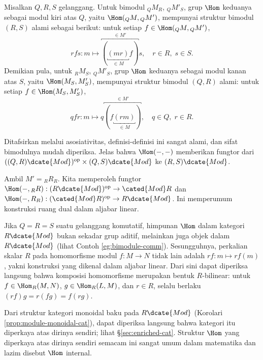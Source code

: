 \begin{definition}\label{def:Hom-bimodule}
	Misalkan $Q, R, S$ gelanggang. Untuk bimodul ${}_Q M_R$, ${}_Q M'_S$, grup $\Hom$ keduanya sebagai modul kiri atas $Q$, yaitu $\Hom({}_Q M, {}_Q M')$, mempunyai struktur bimodul $(R, S)$ alami sebagai berikut: untuk setiap $f \in \Hom({}_Q M, {}_Q M')$,
	\[ rfs: m \longmapsto \overbracket{( \underbracket{(mr)}_{\in M} f )}^{\in M'} s, \quad r \in R, \; s \in S. \]
	Demikian pula, untuk ${}_R M_S$, ${}_Q M'_S$, grup $\Hom$ keduanya sebagai modul kanan atas $S$, yaitu $\Hom(M_S, M'_S)$, mempunyai struktur bimodul $(Q, R)$ alami: untuk setiap $f \in \Hom(M_S, M'_S)$,
	\[ qfr: m \longmapsto q \overbracket{( f\underbracket{(rm)}_{\in M} )}^{\in M'}, \quad q \in Q, \; r \in R. \]
\end{definition}
Ditafsirkan melalui asosiativitas, definisi-definisi ini sangat alami, dan sifat bimodulnya mudah diperiksa. Jelas bahwa $\Hom(-,-)$ memberikan fungtor dari $((Q,R)\dcate{Mod})^\text{op} \times (Q,S)\dcate{Mod}$ ke $(R,S)\dcate{Mod}$.

\begin{example}
	Ambil $M' = {}_R R_R$. Kita memperoleh fungtor $\Hom(-, {}_R R): (R\dcate{Mod})^\text{op} \to \cated{Mod}R$ dan $\Hom(-, R_R): (\cated{Mod}R)^\text{op} \to R\dcate{Mod}$. Ini memperumum konstruksi ruang dual dalam aljabar linear.
\end{example}

\begin{remark}\label{rem:module-internal-Hom} 
	Jika $Q=R=S$ suatu gelanggang komutatif, himpunan $\Hom$ dalam kategori $R\dcate{Mod}$ bukan sekadar grup aditif, melainkan juga objek dalam $R\dcate{Mod}$ (lihat Contoh \ref{eg:bimodule-comm}). Sesungguhnya, perkalian skalar $R$ pada homomorfisme modul $f: M \to N$ tidak lain adalah $rf: m \mapsto rf(m)$, yakni konstruksi yang dikenal dalam aljabar linear. Dari sini dapat diperiksa langsung bahwa komposisi homomorfisme merupakan bentuk $R$-bilinear: untuk $f \in \Hom_R(M,N)$, $g \in \Hom_R(L,M)$, dan $r \in R$, selalu berlaku $(rf)g = r(fg) = f(rg)$.

	Dari struktur kategori monoidal baku pada $R\dcate{Mod}$ (Korolari \ref{prop:module-monoidal-cat}), dapat diperiksa langsung bahwa kategori itu diperkaya atas dirinya sendiri; lihat \S \ref{sec:enriched-cat}. Struktur $\Hom$ yang diperkaya atas dirinya sendiri semacam ini sangat umum dalam matematika dan lazim disebut $\Hom$ internal.
\end{remark}

